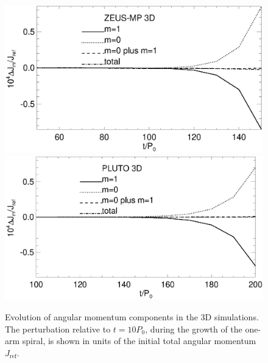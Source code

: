 \begin{figure}
  \includegraphics[scale=.41,clip=true,trim=0cm 1cm 0cm 0cm]{figures/nonaxi_evol_ang_zeus}
  \includegraphics[scale=.41]{figures/nonaxi_evol_ang_pluto}
  \caption{Evolution of angular momentum components in the 3D 
    simulations. The perturbation 
    relative to $t=10P_0$, during the growth of the one-arm spiral,
    is shown in units of the initial total angular momentum
    $J_\mathrm{ref}$.\label{3d_angmom}}  
\end{figure}   

